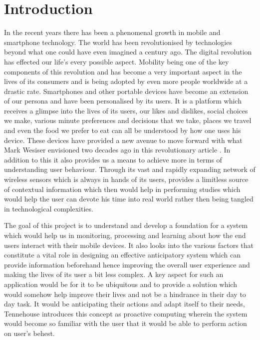 \documentclass[12pt]{report}
\begin{document}
\section{Introduction}
In the recent years there has been a phenomenal growth in mobile and smartphone technology. The world has been revolutionised by technologies beyond what one could have even imagined a century ago. The digital revolution has effected our life's every possible aspect. Mobility being one of the key components of this revolution and has become a very important aspect in the lives of its consumers\cite{ross2011top} and is being adopted by even more people worldwide at a drastic rate. Smartphones and other portable devices have become an extension of our persona and have been personalised by its users. It is a platform which receives a glimpse into the lives of its users, our likes and dislikes, social choices we make, various minute preferences and decisions that we take, places we travel and even the food we prefer to eat can all be understood by how one uses his device. These devices have provided a new avenue to move forward with what Mark Wesiser envisioned two decades ago in this revolutionary article \cite{weiser1991computer}. In addition to this it also provides us a means to achieve more in terms of understanding user behaviour. Through its vast and rapidly expanding network of wireless sensors which is always in hands of its users, provides a limitless source of contextual information \cite{campbell2008rise} which then would help in performing studies which would help the user can devote his time into real world rather then being tangled in technological complexities.

The goal of this project is to understand and develop a foundation for a system which would help us in monitoring, processing and learning about how the end users interact with their mobile devices. It also looks into the various factors that constitute a vital role in designing an effective anticipatory system which can provide information beforehand hence improving the overall user experience and making the lives of its user a bit less complex. A key aspect for such an application would be for it to be ubiquitous and to provide a solution which would somehow help improve their lives and not be a hindrance in their day to day task. It would be anticipating their actions and adapt itself to their needs, Tennehouse\cite{tennenhouse2000proactive} introduces this concept as proactive computing wherein the system would become so familiar with the user that it would be able to perform action on user's behest.
\end{document}
